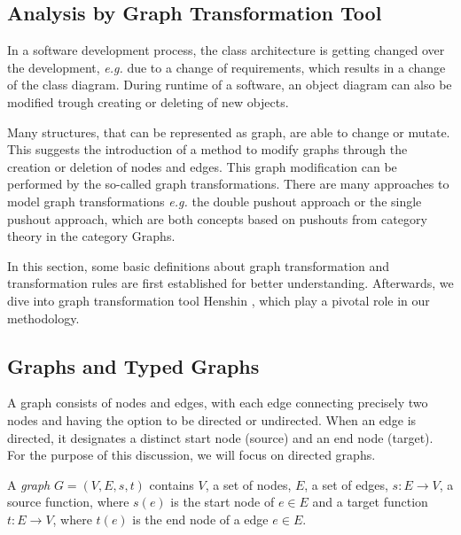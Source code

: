 \subsection{Analysis by Graph Transformation Tool}\label{gts}
In a software development process, the class architecture is getting changed over the development, \emph{e.g.} due to a change of requirements, which results in a change of the class diagram. During runtime of a software, an object diagram can also be modified trough creating or deleting of new objects.

Many structures, that can be represented as graph, are able to change or mutate. This suggests the introduction of a method to modify graphs through the creation or deletion of nodes and edges. This graph modification can be performed by the so-called graph transformations. There are many approaches to model graph transformations \emph{e.g.} the double pushout approach or the single pushout approach, which are both concepts based on pushouts from category theory in the category Graphs.

In this section, some basic definitions about graph transformation and transformation rules are first established for better understanding. Afterwards, we dive into graph transformation tool Henshin \cite{arendt2010henshin}, which play a pivotal role in our methodology.

\subsection*{Graphs and Typed Graphs}
A graph consists of nodes and edges, with each edge connecting precisely two nodes and having the option to be directed or undirected. When an edge is directed, it designates a distinct start node (source) and an end node (target). For the purpose of this discussion, we will focus on directed graphs.

\begin{definition}
\label{def_graph}
A \emph{graph} $G = (V,E,s,t)$ contains $V$, a set of nodes, $E$, a set of edges, $s: E \to V$, a source function, where $s(e)$ is the start node of $e \in E$ and a target function $t:E \to V$, where $t(e)$ is the end node of a edge $e \in E$.
\end{definition}


